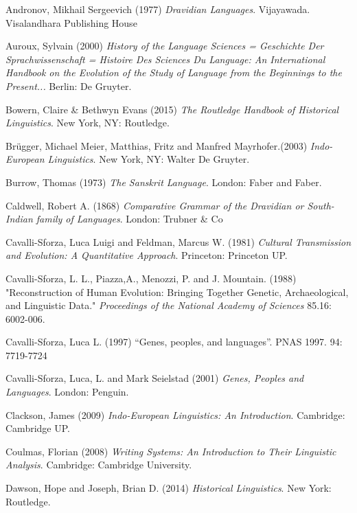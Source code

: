 \begin{thebibliography}{99}
 Andronov, Mikhail Sergeevich (1977) \textit{Dravidian Languages}. Vijayawada. Visalandhara Publishing House

  Auroux, Sylvain (2000) \textit{History of the Language Sciences = Geschichte Der Sprachwissenschaft = Histoire Des Sciences Du Language: An International Handbook on the Evolution of the Study of Language from the Beginnings to the Present...} Berlin: De Gruyter.

  Bowern, Claire \& Bethwyn Evans (2015) \textit{The Routledge Handbook of Historical Linguistics}. New York, NY: Routledge.

  Brügger, Michael Meier, Matthias, Fritz and Manfred Mayrhofer.(2003) \textit{Indo-European Linguistics}. New York, NY: Walter De Gruyter.

  Burrow, Thomas (1973) \textit{The Sanskrit Language}. London: Faber and Faber.

  Caldwell, Robert A. (1868) \textit{Comparative Grammar of the Dravidian or South-Indian family of Languages}. London: Trubner \& Co

  Cavalli-Sforza, Luca Luigi and Feldman, Marcus W. (1981) \textit{Cultural Transmission and Evolution: A Quantitative Approach}. Princeton: Princeton UP.

  Cavalli-Sforza, L. L., Piazza,A., Menozzi, P. and J. Mountain. (1988) "Reconstruction of Human Evolution: Bringing Together Genetic, Archaeological, and Linguistic Data." \textit{Proceedings of the National Academy of Sciences} 85.16: 6002-006.

  Cavalli-Sforza, Luca L. (1997) “Genes, peoples, and languages”. PNAS 1997. 94: 7719-7724

  Cavalli-Sforza, Luca, L. and Mark Seielstad (2001) \textit{Genes, Peoples and Languages}. London: Penguin.

  Clackson, James (2009) \textit{Indo-European Linguistics: An Introduction}. Cambridge: Cambridge UP.

  Coulmas, Florian (2008) \textit{Writing Systems: An Introduction to Their Linguistic Analysis}. Cambridge: Cambridge University.

  Dawson, Hope and Joseph, Brian D. (2014) \textit{Historical Linguistics}. New York: Routledge.


\end{thebibliography}
